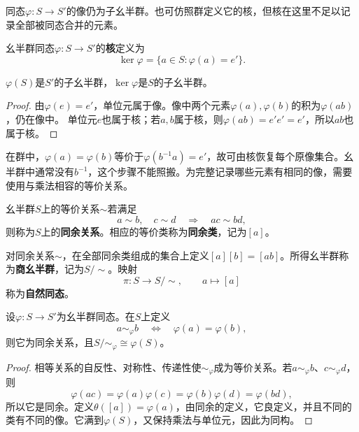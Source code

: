 同态$\varphi:S\to S'$的像仍为子幺半群。也可仿照群定义它的核，但核在这里不足以记录全部被同态合并的元素。

\begin{definition}
幺半群同态$\varphi:S\to S'$的\textbf{核}定义为
\[
\ker\varphi=\{a\in S:\varphi(a)=e'\}.
\]
\end{definition}
\begin{proposition}
$\varphi(S)$是$S'$的子幺半群，$\ker\varphi$是$S$的子幺半群。
\end{proposition}
\begin{proof}
由$\varphi(e)=e'$，单位元属于像。像中两个元素$\varphi(a),\varphi(b)$的积为$\varphi(ab)$，仍在像中。
单位元$e$也属于核；若$a,b$属于核，则$\varphi(ab)=e'e'=e'$，所以$ab$也属于核。
\end{proof}

在群中，$\varphi(a)=\varphi(b)$等价于$\varphi(b^{-1}a)=e'$，故可由核恢复每个原像集合。幺半群中通常没有$b^{-1}$，这个步骤不能照搬。为完整记录哪些元素有相同的像，需要使用与乘法相容的等价关系。

\begin{definition}
幺半群$S$上的等价关系$\sim$若满足
\[
a\sim b,\quad c\sim d\quad\Longrightarrow\quad ac\sim bd,
\]
则称为$S$上的\textbf{同余关系}。相应的等价类称为\textbf{同余类}，记为$[a]$。
\end{definition}



\begin{definition}
对同余关系$\sim$，在全部同余类组成的集合上定义$[a][b]=[ab]$。所得幺半群称为\textbf{商幺半群}，记为$S/{\sim}$。映射
\[
\pi:S\longrightarrow S/{\sim},\qquad a\longmapsto[a]
\]
称为\textbf{自然同态}。
\end{definition}


\begin{theorem}
设$\varphi:S\to S'$为幺半群同态。在$S$上定义
\[
a\sim_\varphi b\quad\Longleftrightarrow\quad\varphi(a)=\varphi(b),
\]
则它为同余关系，且$S/{\sim_\varphi}\cong\varphi(S)$。
\end{theorem}
\begin{proof}
相等关系的自反性、对称性、传递性使$\sim_\varphi$成为等价关系。若$a\sim_\varphi b$、$c\sim_\varphi d$，则
\[
\varphi(ac)=\varphi(a)\varphi(c)=\varphi(b)\varphi(d)=\varphi(bd),
\]
所以它是同余。定义$\theta([a])=\varphi(a)$，由同余的定义，它良定义，并且不同的类有不同的像。它满到$\varphi(S)$，又保持乘法与单位元，因此为同构。
\end{proof}

